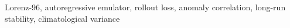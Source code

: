 Lorenz-96, autoregressive emulator, rollout loss, anomaly correlation, long-run stability, climatological variance

